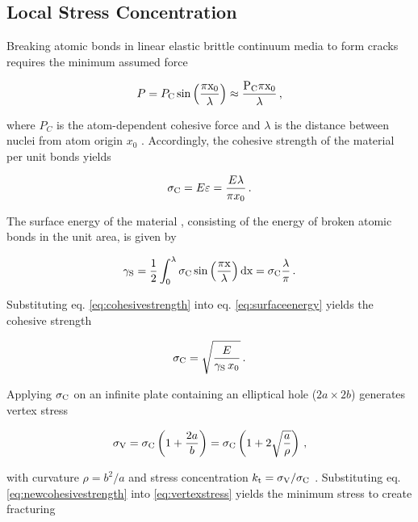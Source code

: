 \documentclass[format=acmtog, 12pt, screen=true, review=false]{acmart}
\begin{document}
\subsection{Local Stress Concentration}

Breaking atomic bonds in linear elastic brittle continuum media to form cracks requires the minimum assumed force

\begin{equation}
\label{eq:minforce}
    P = P_{\rm{C}}\,\rm{sin}\left(\frac{\pi x_{\rm{0}}}{\lambda}\right)\approx \frac{P_{\rm{C}}\pi x_{\rm{0}}}{\lambda}\,,
\end{equation}

where $P_C$ is the atom-dependent cohesive force and $\lambda$ is the distance between nuclei from atom origin $x_0$ \cite{And05}. Accordingly, the cohesive strength of the material per unit bonds \cite{And05} yields

\begin{equation}
\label{eq:cohesivestrength}
    \sigma_{\rm{C}}=E\varepsilon=\frac{E\lambda}{\pi x_{\rm{0}}} \,.
\end{equation}

The surface energy of the material \cite{And05}, consisting of the energy of broken atomic bonds in the unit area, is given by

\begin{equation}
    \label{eq:surfaceenergy}
    \gamma_{\rm{S}}=\frac{1}{2}\int_{0}^{\lambda}\sigma_{\rm{C}}\,\rm{sin}\left(\frac{\pi x}{\lambda}\right)dx=\sigma_{\rm{C}}\frac{\lambda}{\pi} \,.
\end{equation}

Substituting eq. \ref{eq:cohesivestrength} into eq. \ref{eq:surfaceenergy} yields the cohesive strength \cite{And05}

\begin{equation}
    \label{eq:newcohesivestrength}
    \sigma_{\rm{C}}=\sqrt{\frac{E}{\gamma_{\rm{S}}\,x_{\rm{0}}}}\,.
\end{equation}

Applying $\sigma_{\rm{C}}$ on an infinite plate containing an elliptical hole ($2a \times 2b$) generates vertex stress

\begin{equation}
\label{eq:vertexstress}
    \sigma_{\rm{V}}=\sigma_{\rm{C}}\left(1+\frac{2a}{b}\right)=\sigma_{\rm{C}}\left(1+2\sqrt{\frac{a}{\rho}}\right)\,,
\end{equation}

with curvature $\rho=b^2/a$ and stress concentration $k_{\rm{t}} = \sigma_{\rm{V}} / \sigma_{\rm{C}}$ \cite{And05}. Substituting eq. \ref{eq:newcohesivestrength} into \ref{eq:vertexstress} yields the minimum stress to create fracturing 
\end{document}
